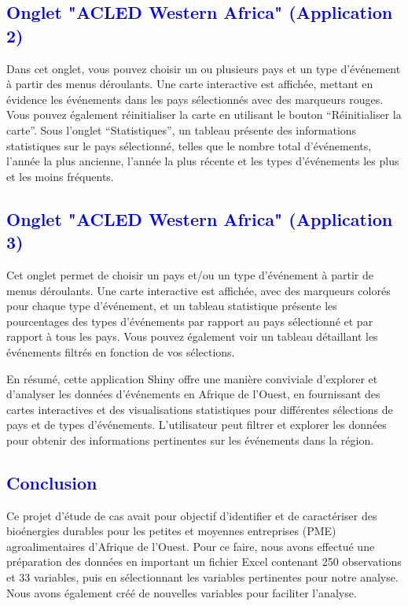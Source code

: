 \documentclass[
]{article}
\begin{document}
\textcolor{blue}{\subsection{Onglet "ACLED Western Africa" (Application 2)}}

Dans cet onglet, vous pouvez choisir un ou plusieurs pays et un type
d'événement à partir des menus déroulants. Une carte interactive est
affichée, mettant en évidence les événements dans les pays sélectionnés
avec des marqueurs rouges. Vous pouvez également réinitialiser la carte
en utilisant le bouton ``Réinitialiser la carte''. Sous l'onglet
``Statistiques'', un tableau présente des informations statistiques sur
le pays sélectionné, telles que le nombre total d'événements, l'année la
plus ancienne, l'année la plus récente et les types d'événements les
plus et les moins fréquents.

\textcolor{blue}{\subsection{Onglet "ACLED Western Africa" (Application 3)}}

Cet onglet permet de choisir un pays et/ou un type d'événement à partir
de menus déroulants. Une carte interactive est affichée, avec des
marqueurs colorés pour chaque type d'événement, et un tableau
statistique présente les pourcentages des types d'événements par rapport
au pays sélectionné et par rapport à tous les pays. Vous pouvez
également voir un tableau détaillant les événements filtrés en fonction
de vos sélections.

En résumé, cette application Shiny offre une manière conviviale
d'explorer et d'analyser les données d'événements en Afrique de l'Ouest,
en fournissant des cartes interactives et des visualisations
statistiques pour différentes sélections de pays et de types
d'événements. L'utilisateur peut filtrer et explorer les données pour
obtenir des informations pertinentes sur les événements dans la région.

\textcolor{blue}{\section*{Conclusion}}

Ce projet d'étude de cas avait pour objectif d'identifier et de
caractériser des bioénergies durables pour les petites et moyennes
entreprises (PME) agroalimentaires d'Afrique de l'Ouest. Pour ce faire,
nous avons effectué une préparation des données en important un fichier
Excel contenant 250 observations et 33 variables, puis en sélectionnant
les variables pertinentes pour notre analyse. Nous avons également créé
de nouvelles variables pour faciliter l'analyse.
\end{document}

